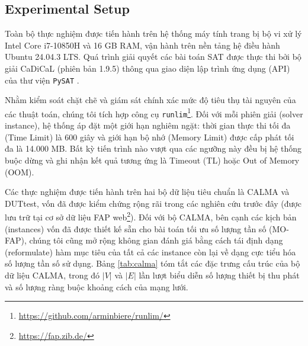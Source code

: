 \documentclass[letterpaper,journal]{IEEEtran}
\begin{document}


\subsection{Experimental Setup}
\label{sec:exp}
Toàn bộ thực nghiệm được tiến hành trên hệ thống máy tính trang bị bộ vi xử lý Intel Core i7-10850H và 16 GB RAM, vận hành trên nền tảng hệ điều hành Ubuntu 24.04.3 LTS. Quá trình giải quyết các bài toán SAT được thực thi bởi bộ giải CaDiCaL (phiên bản 1.9.5) thông qua giao diện lập trình ứng dụng (API) của thư viện \texttt{PySAT} \cite{imms-sat18,itk-sat24}. 

Nhằm kiểm soát chặt chẽ và giám sát chính xác mức độ tiêu thụ tài nguyên của các thuật toán, chúng tôi tích hợp công cụ \texttt{runlim}\footnote{\url{https://github.com/arminbiere/runlim/}}. Đối với mỗi phiên giải (solver instance), hệ thống áp đặt một giới hạn nghiêm ngặt: thời gian thực thi tối đa (Time Limit) là 600 giây và giới hạn bộ nhớ (Memory Limit) được cấp phát tối đa là 14.000 MB. Bất kỳ tiến trình nào vượt qua các ngưỡng này đều bị hệ thống buộc dừng và ghi nhận kết quả tương ứng là Timeout (TL) hoặc Out of Memory (OOM).

Các thực nghiệm được tiến hành trên hai bộ dữ liệu tiêu chuẩn là CALMA và DUTtest, vốn đã được kiểm chứng rộng rãi trong các nghiên cứu trước đây (được lưu trữ tại cơ sở dữ liệu FAP web\footnote{\url{https://fap.zib.de/}}). Đối với bộ CALMA, bên cạnh các kịch bản (instances) vốn đã được thiết kế sẵn cho bài toán tối ưu số lượng tần số (MO-FAP), chúng tôi cũng mở rộng không gian đánh giá bằng cách tái định dạng (reformulate) hàm mục tiêu của tất cả các instance còn lại về dạng cực tiểu hóa số lượng tần số sử dụng. Bảng \ref{tab:calma} tóm tắt các đặc trưng cấu trúc của bộ dữ liệu CALMA, trong đó $|V|$ và $|E|$ lần lượt biểu diễn số lượng thiết bị thu phát và số lượng ràng buộc khoảng cách của mạng lưới.
\end{document}
